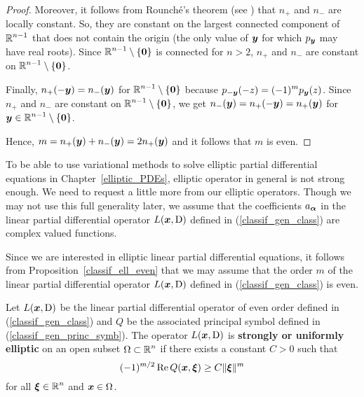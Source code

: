 \begin{proof}
Moreover, it follows from Rounch\'e's theorem (see \cite{Co}) that
$n_+$ and $n_-$ are locally constant.  So, they are constant on the
largest connected component of $\displaystyle \mathbb{R}^{n-1}$ that does not
contain the origin (the only value of ${\bm{y}}$ for which
$p_{{\bm{y}}}$ may have real roots).  Since
$\displaystyle \mathbb{R}^{n-1}\setminus\{{\bm{0}}\}$ is connected for
$n>2$,  $n_+$ and $n_-$ are constant on
$\displaystyle \mathbb{R}^{n-1}\setminus\{{\bm{0}}\}$.

Finally, $n_+(-{\bm{y}}) = n_-({\bm{y}})$ for
$\displaystyle \mathbb{R}^{n-1}\setminus\{{\bm{0}}\}$ because
$\displaystyle p_{-{\bm{y}}}(-z) = (-1)^m p_{{\bm{y}}}(z)$.  Since $n_+$
and $n_-$ are constant on $\displaystyle \mathbb{R}^{n-1}\setminus\{{\bm{0}}\}$, we get
$n_-({\bm{y}}) = n_+(-{\bm{y}}) = n_+({\bm{y}})$ for
$\displaystyle {\bm{y}} \in \mathbb{R}^{n-1}\setminus\{{\bm{0}}\}$.

Hence, $m = n_+({\bm{y}})+n_-({\bm{y}}) = 2n_+({\bm{y}})$ and it follows
that $m$ is even.
\end{proof}

To be able to use variational methods to solve elliptic partial
differential equations in Chapter~\ref{elliptic_PDEs}, elliptic
operator in general is not strong enough.  We need to request a little
more from our elliptic operators.
Though we may not use this full generality later, we assume that the
coefficients $a_{{\bm{\alpha}}}$ in the linear partial differential operator
$L({\bm{x}}, \operatorname{D})$ defined in (\ref{classif_gen_class}) are complex
valued functions.

Since we are interested in elliptic linear partial differential
equations, it follows from Proposition~\ref{classif_ell_even} that we
may assume that the order $m$ of the linear partial differential operator
$L({\bm{x}}, \operatorname{D})$ defined in (\ref{classif_gen_class}) is even.

\begin{defn} \label{strong_ell_form}
Let $L({\bm{x}}, \operatorname{D})$ be the linear partial differential operator of
even order defined in (\ref{classif_gen_class}) and $Q$ be the
associated principal symbol defined in (\ref{classif_gen_princ_symb}).
The operator $L({\bm{x}}, \operatorname{D})$ is
{\bfseries strongly or uniformly elliptic}%
%
on an open subset $\displaystyle \Omega \subset \mathbb{R}^n$ if there exists
a constant $C>0$ such that
\begin{equation} \label{strong_ell_formEq1}
(-1)^{m/2} \operatorname{Re} Q({\bm{x}}, {\bm{\xi}}) \geq C \|{\bm{\xi}}\|^m
\end{equation}
for all $\displaystyle {\bm{\xi}} \in \mathbb{R}^n$ and ${\bm{x}}\in \Omega$.
\end{defn}

